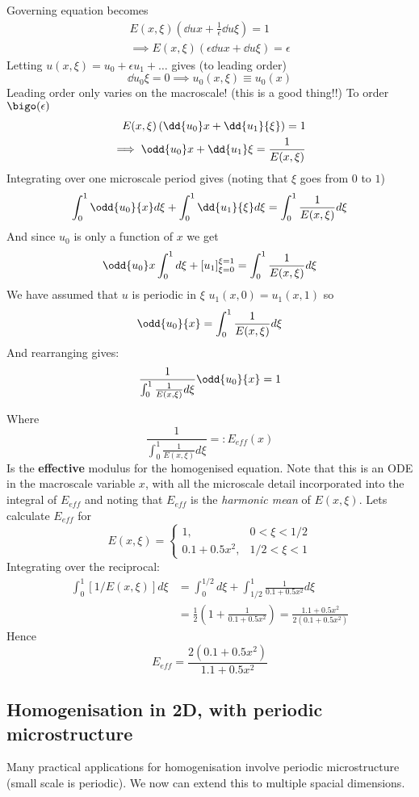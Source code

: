 \documentclass{X:/Documents/Coding/Latex/myassignment}
\begin{document}
Governing equation becomes
\begin{align*}
    E(x,\xi) \left(\dd ux + \frac1\epsilon \dd u\xi \right) =1\\
    \implies E(x,\xi) \left(\epsilon \dd ux + \dd u\xi \right) = \epsilon
\end{align*}
Letting $u(x,\xi) = u_0 + \epsilon u_1 + \hdots$ gives (to leading order)
\[\dd{u_0}\xi = 0 \implies u_0(x,\xi) \equiv u_0(x)\]
Leading order only varies on the macroscale! (this is a good thing!!)
To order $\bigo(\epsilon)$
\begin{align*}
    E(x,\xi) \left(\dd{u_0}x + \dd{u_1}{\xi}\right) =1\\
    \implies \odd{u_0} x  +\dd{u_1}\xi = \frac{1}{E(x,\xi)}
\end{align*}
Integrating over one microscale period gives (noting that $\xi$ goes from $0$ to $1$)
\[\int_0^1 \odd{u_0}{x} d\xi + \int_0^1 \dd{u_1}{\xi} d\xi = \int_0^1 \frac1{E(x,\xi)} d\xi\]
And since $u_0$ is only a function of $x$ we get
\[\odd{u_0}x \int_0^1 d\xi + [u_1]_{\xi=0}^{\xi=1} = \int_0^1 \frac{1}{E(x,\xi)} d\xi\]
We have assumed that $u$ is periodic in $\xi$  $u_1(x,0) = u_1(x,1)$ so
\[\odd{u_0}{x} = \int_0^1 \frac{1}{E(x,\xi)} d\xi\]
And rearranging gives:
\[\frac{1}{\int_0^1 \frac{1}{E(x,\xi)} d\xi}\odd{u_0}{x} = 1\]

Where 
\[\frac{1}{\int_0^1 \frac{1}{E(x,\xi)} d\xi} =: E_{eff}(x)\]
Is the \textbf{effective} modulus for the homogenised equation. Note that this is an ODE in the macroscale variable $x$, with all the microscale detail incorporated into the integral of $E_{eff}$ and noting that $E_{eff}$ is the \emph{harmonic mean} of $E(x,\xi)$. 
Lets calculate $E_{eff}$ for
\[E(x,\xi) = \begin{cases}
    1, &0<\xi<1/2\\
    0.1 + 0.5x^2,& 1/2<\xi<1    
\end{cases}\]
Integrating over the reciprocal:
\begin{align*}
    \int_0^1 \left[1/E(x,\xi)\right]d\xi &= \int_0^{1/2} d\xi + \int_{1/2}^1 \frac{1}{0.1+0.5x^2} d\xi\\
    &= \frac12\left(1 + \frac{1}{0.1 + 0.5 x^2}\right) = \frac{1.1 + 0.5x^2}{2(0.1 + 0.5x^2)}
\end{align*}
Hence 
\[E_{eff} = \frac{2(0.1 + 0.5x^2)}{1.1 + 0.5x^2} \]

\subsection{Homogenisation in 2D, with periodic microstructure}
Many practical applications for homogenisation involve periodic microstructure (small scale is periodic). We now can extend this to multiple spacial dimensions.
\end{document}
